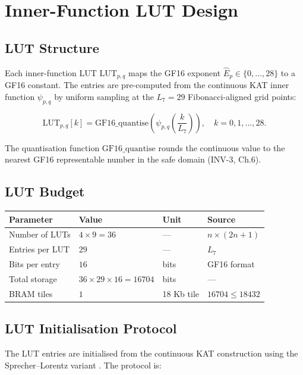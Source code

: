 \section{Inner-Function LUT Design}
\label{app:G-inner-lut}

\subsection{LUT Structure}

Each inner-function LUT $\mathrm{LUT}_{p,q}$ maps the GF16 exponent
$\hat{E}_p \in \{0, \ldots, 28\}$ to a GF16 constant. The entries are
pre-computed from the continuous KAT inner function $\psi_{p,q}$ by
uniform sampling at the $L_7 = 29$ Fibonacci-aligned grid points:

\begin{equation}
\label{eq:G-lut-entries}
\mathrm{LUT}_{p,q}[k] = \mathrm{GF16\_quantise}\!\left(\psi_{p,q}\!\left(\frac{k}{L_7}\right)\right), \quad k = 0, 1, \ldots, 28.
\end{equation}

The quantisation function $\mathrm{GF16\_quantise}$ rounds the
continuous value to the nearest GF16 representable number in the
safe domain (INV-3, Ch.6).

\subsection{LUT Budget}

\begin{longtable}[]{@{}llll@{}}
\toprule\noalign{}
Parameter & Value & Unit & Source \\
\midrule\noalign{}
\endhead
\bottomrule\noalign{}
\endlastfoot
Number of LUTs & $4 \times 9 = 36$ & --- & $n \times (2n+1)$ \\
Entries per LUT & $29$ & --- & $L_7$ \\
Bits per entry & $16$ & bits & GF16 format \\
Total storage & $36 \times 29 \times 16 = 16704$ & bits & --- \\
BRAM tiles & $1$ & 18 Kb tile & $16704 \leq 18432$ \\
\end{longtable}

\subsection{LUT Initialisation Protocol}

The LUT entries are initialised from the continuous KAT construction
using the Sprecher--Lorentz variant \cite{sprecher1965, lorentz1966}.
The protocol is:

